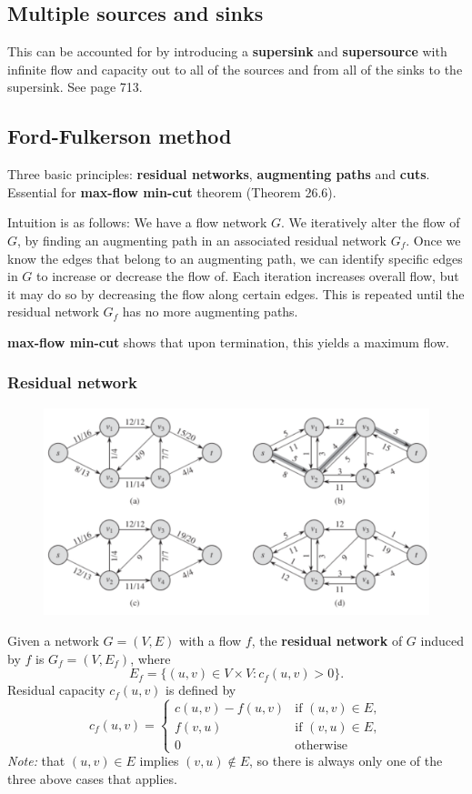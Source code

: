 \subsection{Multiple sources and sinks}
This can be accounted for by introducing a \textbf{supersink} and \textbf{supersource} with infinite
flow and capacity out to all of the sources and from all of the sinks to the supersink. See page 713.

\subsection{Ford-Fulkerson method}
Three basic principles: \textbf{residual networks}, \textbf{augmenting paths} and \textbf{cuts}.
Essential for \textbf{max-flow min-cut} theorem (Theorem 26.6).

Intuition is as follows: We have a flow network $G$. We iteratively alter the flow of $G$, 
by finding an augmenting path in an associated residual network $G_f$. Once we know the edges
that belong to an augmenting path, we can identify specific edges in $G$ to increase or decrease
the flow of. Each iteration increases overall flow, but it may do so by decreasing the flow along
certain edges. This is repeated until the residual network $G_f$ has no more augmenting paths.

\textbf{max-flow min-cut} shows that upon termination, this yields a maximum flow.

\subsubsection{Residual network}
\begin{figure}
	\centering
	\includegraphics[width=\textwidth]{images/augmenting_paths}
\end{figure}
Given a network $G = (V,E)$ with a flow $f$, the \textbf{residual network}
of $G$ induced by $f$ is $G_f = (V, E_f)$, where
\[
	E_f = \{(u,v) \in V \times V : c_f(u,v) > 0\}.
\]
Residual capacity $c_f(u,v)$ is defined by
\[
 c_f(u,v) =
  \begin{cases}
  	c(u,v) - f(u,v) & \text{if } (u,v) \in E, \\
  	f(v,u) & \text{if } (v,u) \in E, \\
  	0 & \text{otherwise}
  \end{cases}
\]
\textit{Note:} that $(u,v) \in E$ implies $(v,u) \notin E$, so there is always only one of the three
above cases that applies. 

